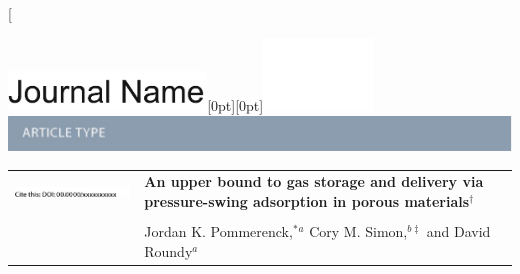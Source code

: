 \documentclass[twoside,twocolumn,9pt]{article}
\begin{document}
\twocolumn[
  \begin{@twocolumnfalse}
{\includegraphics[height=30pt]{head_foot/journal_name}\hfill\raisebox{0pt}[0pt][0pt]{\includegraphics[height=55pt]{head_foot/RSC_LOGO_CMYK}}\\[1ex]
\includegraphics[width=18.5cm]{head_foot/header_bar}}\par
\vspace{1em}
\sffamily
\begin{tabular}{m{4.5cm} p{13.5cm} }

\includegraphics{head_foot/DOI} & \noindent\LARGE{\textbf{An upper bound to gas storage and delivery via pressure-swing adsorption in
porous materials$^\dag$}} \\%
\vspace{0.3cm} & \vspace{0.3cm} \\

 & \noindent\large{Jordan K. Pommerenck,$^{\ast}$\textit{$^{a}$} Cory M. Simon,\textit{$^{b\ddag}$} and David Roundy\textit{$^{a}$}} \\%


\end{tabular}
\end{@twocolumnfalse}
\end{document}
